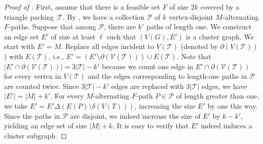 \begin{proof}[Proof of ]
  First, assume that there is a feasible set $F$ of size $2k$ covered by a triangle packing~$\mathcal{T}$.
  By , we have a collection $\mathcal{P}$ of $k$ vertex-disjoint $M$-alternating $F$-paths.
  Suppose that among $\mathcal{P}$, there are $k'$ paths of length one.
  We construct an edge set $E'$ of size at least $\ell$ such that $(V(G), E')$ is a cluster graph.
  We start with $E' = M$.
  Replace all edges incident to $V(\mathcal{T})$ (denoted by $\partial(V(\mathcal{T}))$) with $E(\mathcal{T})$, i.e., $E' = (E' \setminus \partial(\mathcal{V(\mathcal{T})})) \cup E(\mathcal{T})$.
  Note that $|E' \cap \partial(\mathcal{V(\mathcal{T})})| = 3|\mathcal{T}| - k'$ because we count one edge in $E' \cap \partial(\mathcal{V(\mathcal{T})})$ for every vertex in $V(\mathcal{T})$ and the edges corresponding to length-one paths in $\mathcal{P}$ are counted twice.
  Since $3|\mathcal{T}| - k'$ edges are replaced with $3|\mathcal{T}|$ edges, we have $|E'| = |M| + k'$.
  For every $M$-alternating $F$-path $P \in \mathcal{P}$ of length greater than one, we take $E' = E' \Delta (E(P) \setminus \delta(V(T)))$, increasing the size $E'$ by one this way.
  Since the paths in $\mathcal{P}$ are disjoint, we indeed increase the size of $E'$ by $k - k'$, yielding an edge set of size $|M| + k$.
  It is easy to verify that $E'$ indeed induces a cluster subgraph.


\end{proof}
